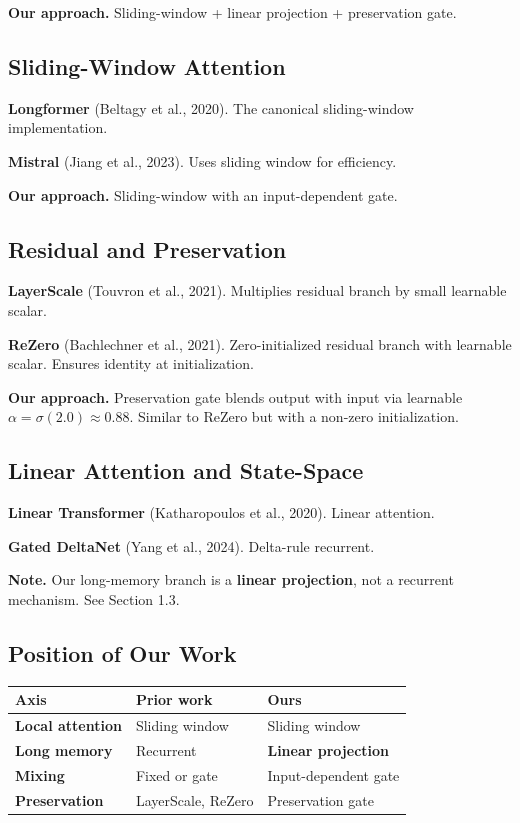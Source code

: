 \textbf{Our approach.} Sliding-window + linear projection + preservation gate.

\subsection{Sliding-Window Attention}

\textbf{Longformer} (Beltagy et al., 2020). The canonical sliding-window 
implementation.

\textbf{Mistral} (Jiang et al., 2023). Uses sliding window for efficiency.

\textbf{Our approach.} Sliding-window with an input-dependent gate.

\subsection{Residual and Preservation}

\textbf{LayerScale} (Touvron et al., 2021). Multiplies residual branch by small 
learnable scalar.

\textbf{ReZero} (Bachlechner et al., 2021). Zero-initialized residual branch 
with learnable scalar. Ensures identity at initialization.

\textbf{Our approach.} Preservation gate blends output with input via learnable 
$\alpha = \sigma(2.0) \approx 0.88$. Similar to ReZero but with a 
non-zero initialization.

\subsection{Linear Attention and State-Space}

\textbf{Linear Transformer} (Katharopoulos et al., 2020). Linear attention.

\textbf{Gated DeltaNet} (Yang et al., 2024). Delta-rule recurrent.

\textbf{Note.} Our long-memory branch is a \textbf{linear projection}, not a recurrent 
mechanism. See Section 1.3.

\subsection{Position of Our Work}

\begin{table}[H]
\centering
\small
\begin{tabular}{lll}
\toprule
\textbf{Axis} & \textbf{Prior work} & \textbf{Ours} \\
\midrule
\textbf{Local attention} & Sliding window & Sliding window \\
\textbf{Long memory} & Recurrent & \textbf{Linear projection} \\
\textbf{Mixing} & Fixed or gate & Input-dependent gate \\
\textbf{Preservation} & LayerScale, ReZero & Preservation gate \\
\bottomrule
\end{tabular}
\end{table}

